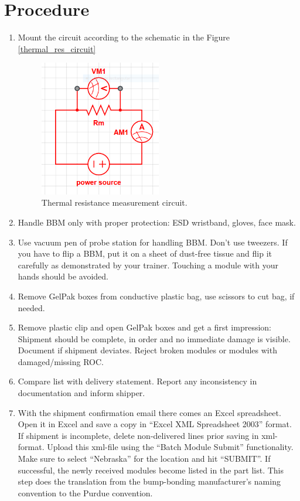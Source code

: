 \documentclass[12pt]{unlsilabsop}
\begin{document}
\section{Procedure}

\begin{enumerate}
    \item Mount the circuit according to the schematic in the Figure \ref{thermal_res_circuit}
      \begin{center}
        \begin{figure}[h]
          \includegraphics[width=0.5\textwidth]{img/Rm_circuit.png}
          \caption{Thermal resistance measurement circuit.}
          \label{setup}
        \end{figure}
      \end{center}

    \item Handle BBM only with proper protection: ESD wristband, gloves, face mask.
    \item Use vacuum pen of probe station for handling BBM. Don't use tweezers. If you have to flip a BBM, put it on a sheet of dust-free tissue and flip it carefully as demonstrated by your trainer. Touching a module with your hands should be avoided.
    \item Remove GelPak boxes from conductive plastic bag, use scissors to cut bag, if needed.
    \item Remove plastic clip and open GelPak boxes and get a first impression: Shipment should be complete, in order and no immediate damage is visible. Document if shipment deviates. Reject broken modules or modules with damaged/missing ROC.
    \item Compare list with delivery statement. Report any inconsistency in documentation and inform shipper.
    \item With the shipment confirmation email there comes an Excel spreadsheet. Open it in Excel and save a copy in ``Excel XML Spreadsheet 2003'' format. If shipment is incomplete, delete non-delivered lines prior saving in xml-format. Upload this xml-file using the ``Batch Module Submit'' functionality. Make sure to select ``Nebraska'' for the location and hit ``SUBMIT''. If successful, the newly received modules become listed in the part list. This step does the translation from the bump-bonding manufacturer's naming convention to the Purdue convention.


\end{enumerate}
\end{document}
